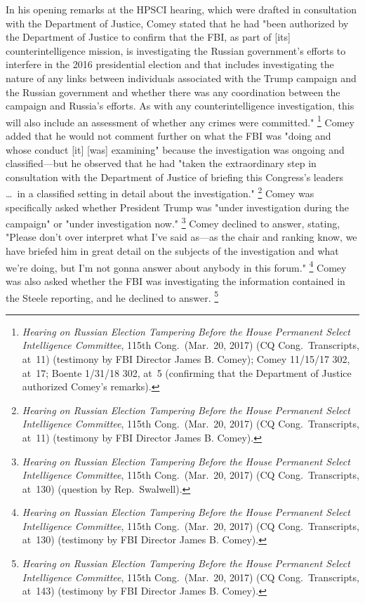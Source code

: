 In his opening remarks at the HPSCI hearing, which were drafted in consultation with the Department of Justice, Comey stated that he had "been authorized by the Department of Justice to confirm that the FBI, as part of [its] counterintelligence mission, is investigating the Russian government's efforts to interfere in the 2016 presidential election and that includes investigating the nature of any links between individuals associated with the Trump campaign and the Russian government and whether there was any coordination between the campaign and Russia's efforts.
As with any counterintelligence investigation, this will also include an assessment of whether any crimes were committed."%
\footnote{\textit{Hearing on Russian Election Tampering Before the House Permanent Select Intelligence Committee}, 115th Cong.\ (Mar.~20, 2017) (CQ Cong.\ Transcripts, at~11) (testimony by FBI Director James B. Comey);
Comey 11/15/17 302, at~17;
Boente 1/31/18 302, at~5 (confirming that the Department of Justice authorized Comey's remarks).}
Comey added that he would not comment further on what the FBI was "doing and whose conduct [it] [was] examining" because the investigation was ongoing and classified---but he observed that he had "taken the extraordinary step in consultation with the Department of Justice of briefing this Congress's leaders \dots\ in a classified setting in detail about the investigation."%
\footnote{\textit{Hearing on Russian Election Tampering Before the House Permanent Select Intelligence Committee}, 115th Cong.\ (Mar.~20, 2017) (CQ Cong.\ Transcripts, at~11) (testimony by FBI Director James B. Comey).}
Comey was specifically asked whether President Trump was "under investigation during the campaign" or "under investigation now."%
\footnote{\textit{Hearing on Russian Election Tampering Before the House Permanent Select Intelligence Committee}, 115th Cong.\ (Mar.~20, 2017) (CQ Cong.\ Transcripts, at~130) (question by Rep.~Swalwell).}
Comey declined to answer, stating, "Please don't over interpret what I've said as---as the chair and ranking know, we have briefed him in great detail on the subjects of the investigation and what we're doing, but I'm not gonna answer about anybody in this forum."%
\footnote{\textit{Hearing on Russian Election Tampering Before the House Permanent Select Intelligence Committee}, 115th Cong.\ (Mar.~20, 2017) (CQ Cong.\ Transcripts, at~130) (testimony by FBI Director James B. Comey).}
Comey was also asked whether the FBI was investigating the information contained in the Steele reporting, and he declined to answer.%
\footnote{\textit{Hearing on Russian Election Tampering Before the House Permanent Select Intelligence Committee}, 115th Cong.\ (Mar.~20, 2017) (CQ Cong.\ Transcripts, at~143) (testimony by FBI Director James B. Comey).}

